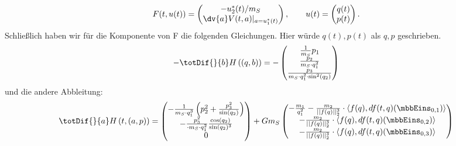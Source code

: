 \documentclass{subfiles}
\begin{document}
    \begin{align*}
        F(t,u(t)) = \begin{pmatrix}
            -u_2^*(t)/m_S\\
            \dv{a}V(t,a)|_{a=u_1^* (t)}
        \end{pmatrix}, \qquad u(t) = \begin{pmatrix}
            q(t)\\
            p(t)
        \end{pmatrix}.
    \end{align*}
    Schließlich haben wir für die Komponente von F die folgenden Gleichungen. Hier würde $q(t), p(t)$ als $q, p$ geschrieben.
    \begin{align*}
        -\totDif{}{b} H\left((q, b)\right) = -
        \begin{pmatrix}
            \frac{1}{m_S}p_1\\
            \frac{p_2}{m_S\cdot q_1^2}\\
            \frac{p_3}{m_S\cdot q_1^2\cdot\sin^2(q_2)}
        \end{pmatrix}
    \end{align*}
    und die andere Abbleitung:
    \begin{align*}
        \totDif{}{a} H\left(t,(a,p)\right) = 
        \begin{pmatrix}
            -\frac{1}{m_S\cdot q_1^3} \left(p_2^2 + \frac{p_3^2}{\sin(q_2)}\right)\\
            -\frac{p_3^2}{\cdot m_S\cdot q_1^2} \frac{\cos(q_2)}{\sin(q_2)^3}\\
            0
        \end{pmatrix}
        + Gm_S
        \begin{pmatrix}
            -\frac{m_1}{q_1^2} -\frac{m_2}{||f(q)||_2^3}\cdot \langle f(q), df(t, q)(\mbbEins_{0,1})\rangle\\
            -\frac{m_2}{||f(q)||_2^3}\cdot \langle f(q), df(t, q)(\mbbEins_{0,2})\rangle\\
            -\frac{m_2}{||f(q)||_2^3}\cdot \langle f(q), df(t, q)(\mbbEins_{0,3})\rangle
        \end{pmatrix}
    \end{align*}
\end{document}
